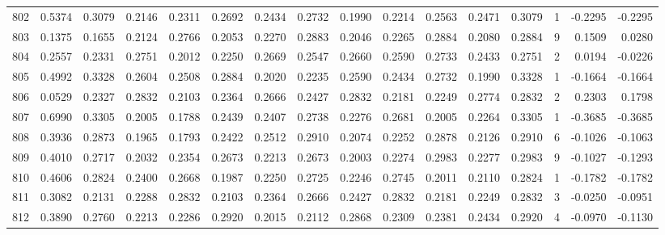 \begin{tabular}{lrrrrrrrrrrrrrrr}
802 &      0.5374 &  0.3079 &  0.2146 &  0.2311 &  0.2692 &  0.2434 &  0.2732 &  0.1990 &  0.2214 &  0.2563 &   0.2471 &     0.3079 &      1 &                   -0.2295 &                    -0.2295 \\
803 &      0.1375 &  0.1655 &  0.2124 &  0.2766 &  0.2053 &  0.2270 &  0.2883 &  0.2046 &  0.2265 &  0.2884 &   0.2080 &     0.2884 &      9 &                    0.1509 &                     0.0280 \\
804 &      0.2557 &  0.2331 &  0.2751 &  0.2012 &  0.2250 &  0.2669 &  0.2547 &  0.2660 &  0.2590 &  0.2733 &   0.2433 &     0.2751 &      2 &                    0.0194 &                    -0.0226 \\
805 &      0.4992 &  0.3328 &  0.2604 &  0.2508 &  0.2884 &  0.2020 &  0.2235 &  0.2590 &  0.2434 &  0.2732 &   0.1990 &     0.3328 &      1 &                   -0.1664 &                    -0.1664 \\
806 &      0.0529 &  0.2327 &  0.2832 &  0.2103 &  0.2364 &  0.2666 &  0.2427 &  0.2832 &  0.2181 &  0.2249 &   0.2774 &     0.2832 &      2 &                    0.2303 &                     0.1798 \\
807 &      0.6990 &  0.3305 &  0.2005 &  0.1788 &  0.2439 &  0.2407 &  0.2738 &  0.2276 &  0.2681 &  0.2005 &   0.2264 &     0.3305 &      1 &                   -0.3685 &                    -0.3685 \\
808 &      0.3936 &  0.2873 &  0.1965 &  0.1793 &  0.2422 &  0.2512 &  0.2910 &  0.2074 &  0.2252 &  0.2878 &   0.2126 &     0.2910 &      6 &                   -0.1026 &                    -0.1063 \\
809 &      0.4010 &  0.2717 &  0.2032 &  0.2354 &  0.2673 &  0.2213 &  0.2673 &  0.2003 &  0.2274 &  0.2983 &   0.2277 &     0.2983 &      9 &                   -0.1027 &                    -0.1293 \\
810 &      0.4606 &  0.2824 &  0.2400 &  0.2668 &  0.1987 &  0.2250 &  0.2725 &  0.2246 &  0.2745 &  0.2011 &   0.2110 &     0.2824 &      1 &                   -0.1782 &                    -0.1782 \\
811 &      0.3082 &  0.2131 &  0.2288 &  0.2832 &  0.2103 &  0.2364 &  0.2666 &  0.2427 &  0.2832 &  0.2181 &   0.2249 &     0.2832 &      3 &                   -0.0250 &                    -0.0951 \\
812 &      0.3890 &  0.2760 &  0.2213 &  0.2286 &  0.2920 &  0.2015 &  0.2112 &  0.2868 &  0.2309 &  0.2381 &   0.2434 &     0.2920 &      4 &                   -0.0970 &                    -0.1130 \\

\end{tabular}
